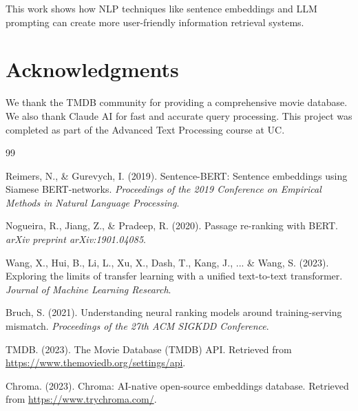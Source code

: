 \documentclass[11pt,a4paper]{article}
\begin{document}
This work shows how NLP techniques like sentence embeddings and LLM prompting can create more user-friendly information retrieval systems.

\section*{Acknowledgments}

We thank the TMDB community for providing a comprehensive movie database. We also thank Claude AI for fast and accurate query processing. This project was completed as part of the Advanced Text Processing course at UC.

\begin{thebibliography}{99}

 Reimers, N., \& Gurevych, I. (2019). Sentence-BERT: Sentence embeddings using Siamese BERT-networks. \textit{Proceedings of the 2019 Conference on Empirical Methods in Natural Language Processing}.

 Nogueira, R., Jiang, Z., \& Pradeep, R. (2020). Passage re-ranking with BERT. \textit{arXiv preprint arXiv:1901.04085}.

 Wang, X., Hui, B., Li, L., Xu, X., Dash, T., Kang, J., ... \& Wang, S. (2023). Exploring the limits of transfer learning with a unified text-to-text transformer. \textit{Journal of Machine Learning Research}.

 Bruch, S. (2021). Understanding neural ranking models around training-serving mismatch. \textit{Proceedings of the 27th ACM SIGKDD Conference}.

 TMDB. (2023). The Movie Database (TMDB) API. Retrieved from \url{https://www.themoviedb.org/settings/api}.

 Chroma. (2023). Chroma: AI-native open-source embeddings database. Retrieved from \url{https://www.trychroma.com/}.

\end{thebibliography}
\end{document}
